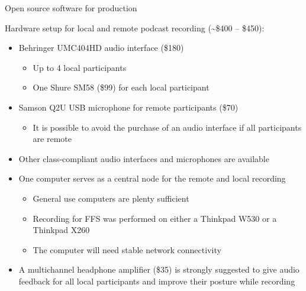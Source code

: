 \begin{frame}{Open source software for production}

    Hardware setup for local and remote podcast recording (\textasciitilde \$400 -- \$450):
    \begin{itemize}
        \item Behringer UMC404HD audio interface (\$180)
        \begin{itemize}
            \item Up to 4 local participants
            \item One Shure SM58 (\$99) for each local participant
        \end{itemize}
        \item Samson Q2U USB microphone for remote participants (\$70)
        \begin{itemize}
            \item It is possible to avoid the purchase of an audio interface if all participants are remote
        \end{itemize}
        \item Other class-compliant audio interfaces and microphones are available
        \item One computer serves as a central node for the remote and local recording
        \begin{itemize}
            \item General use computers are plenty sufficient
            \item Recording for FFS was performed on either a Thinkpad W530 or a Thinkpad X260
            \item The computer will need stable network connectivity
        \end{itemize}
        \item A multichannel headphone amplifier (\$35) is strongly suggested to give audio feedback for all local participants and improve their posture while recording
    \end{itemize}

\end{frame}

